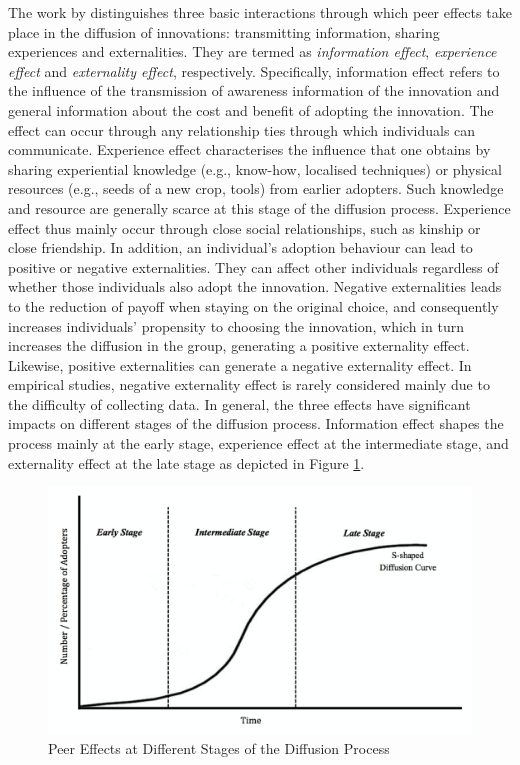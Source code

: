 \documentclass{bmcart}
\renewcommand{\figurename}{Figure }
\begin{document}
The work by \cite{Xiong2016} distinguishes three basic interactions through which peer effects take place in the diffusion of innovations: transmitting information, sharing experiences and externalities. They are termed as \emph{information effect}, \emph{experience effect} and \emph{externality effect}, respectively. Specifically, information effect refers to the influence of the transmission of awareness information of the innovation and general information about the cost and benefit of adopting the innovation. The effect can occur through any relationship ties through which individuals can communicate. Experience effect characterises the influence that one obtains by sharing experiential knowledge (e.g., know-how, localised techniques) or physical resources (e.g., seeds of a new crop, tools) from earlier adopters. Such knowledge and resource are generally scarce at this stage of the diffusion process. Experience effect thus mainly occur through close social relationships, such as kinship or close friendship. In addition, an individual's adoption behaviour can lead to positive or negative externalities. They can affect other individuals regardless of whether those individuals also adopt the innovation. Negative externalities leads to the reduction of payoff when staying on the original choice, and consequently increases individuals' propensity to choosing the innovation, which in turn increases the diffusion in the group, generating a positive externality effect. Likewise, positive externalities can generate a negative externality effect. In empirical studies, negative externality effect is rarely considered mainly due to the difficulty of collecting data. In general, the three effects have significant impacts on different stages of the diffusion process. Information effect shapes the process mainly at the early stage, experience effect at the intermediate stage, and externality effect at the late stage as depicted in \figurename \ref{Fig: peer effects diffusion curve}. 

\begin{center}
\begin{figure}[ht!]
\centering
\includegraphics[scale=0.15]{peer_effects_and_diffusion_curve.jpg}
\caption{Peer Effects at Different Stages of the Diffusion Process}
\label{Fig: peer effects diffusion curve}
\end{figure}
\end{center}
\end{document}
